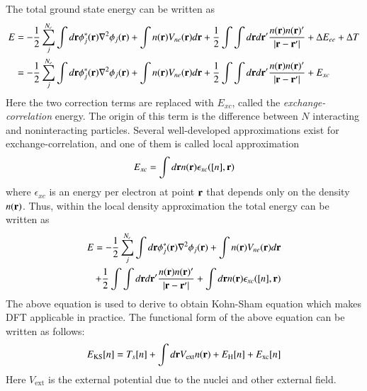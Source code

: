 The total ground state energy can be written as
\begin{equation}
\begin{split}
E  & = -\frac{1}{2}\sum_j^{N_e} \int d\vb{r} \phi^{\ast}_j (\vb{r})\nabla^2 \phi_j(\vb{r}) + \int n(\vb{r})V_{ne}(\vb{r})d\vb{r} +  \frac{1}{2}\int\int d\vb{r}d\vb{r}' \frac{n(\vb{r})n(\vb{r})'}{\abs{\vb{r}-\vb{r}'}} + \Delta E_{ee} + \Delta T \\
   & =-\frac{1}{2}\sum_j^{N_e} \int d\vb{r} \phi^{\ast}_j (\vb{r})\nabla^2 \phi_j(\vb{r}) + \int n(\vb{r})V_{ne}(\vb{r})d\vb{r} +  \frac{1}{2}\int\int d\vb{r}d\vb{r}' \frac{n(\vb{r})n(\vb{r})'}{\abs{\vb{r}-\vb{r}'}} + E_{xc}
\end{split}
\end{equation}
Here the two correction terms are replaced with $E_{xc}$, called the \textit{exchange-correlation} energy. The origin of this term is the difference between $N$ interacting and noninteracting particles. Several well-developed approximations exist for exchange-correlation, and one of them is called local approximation
\begin{equation}\label{ldaeqn}
E_{xc} = \int d\vb{r} n(\vb{r})\epsilon_{xc}([n],\vb{r})
\end{equation}
where $\epsilon_{xc}$ is an energy per electron at point $\vb{r}$ that depends only on the density $n(\vb{r})$. Thus, within the local density approximation the total energy can be written as
\begin{align}\label{toteeqn}
\begin{split}
E=-\frac{1}{2}\sum_j^{N_e} \int d\vb{r} \phi^{\ast}_j (\vb{r})\nabla^2 \phi_j(\vb{r}) + \int n(\vb{r})V_{ne}(\vb{r})d\vb{r}  \\
+ \frac{1}{2}\int\int d\vb{r}d\vb{r}' \frac{n(\vb{r})n(\vb{r})'}{\abs{\vb{r}-\vb{r}'}} + \int d\vb{r} n(\vb{r})\epsilon_{xc}([n],\vb{r})
\end{split}
\end{align}
The above equation is used to derive to obtain Kohn-Sham equation which makes DFT applicable in practice. The functional form of the above equation can be written as follows:
\begin{equation}
E_{\text{KS}}[n] = T_s[n] + \int d\vb{r} V_{\text{ext}}n(\vb{r}) + E_{\text{H}}[n] + E_{\text{xc}}[n]
\end{equation}
Here $V_{\text{ext}}$ is the external potential due to the nuclei and other external field.


